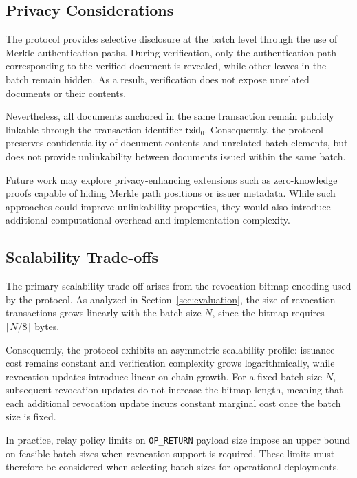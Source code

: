\documentclass{IEEEoj}
\begin{document}
\subsection{Privacy Considerations}

The protocol provides selective disclosure at the batch level through the use of Merkle authentication paths. 
During verification, only the authentication path corresponding to the verified document is revealed, while other leaves in the batch remain hidden. 
As a result, verification does not expose unrelated documents or their contents.

Nevertheless, all documents anchored in the same transaction remain publicly linkable through the transaction identifier $\mathsf{txid}_0$. 
Consequently, the protocol preserves confidentiality of document contents and unrelated batch elements, but does not provide unlinkability between documents issued within the same batch.

Future work may explore privacy-enhancing extensions such as zero-knowledge proofs capable of hiding Merkle path positions or issuer metadata. 
While such approaches could improve unlinkability properties, they would also introduce additional computational overhead and implementation complexity.

\subsection{Scalability Trade-offs}

The primary scalability trade-off arises from the revocation bitmap encoding used by the protocol. 
As analyzed in Section~\ref{sec:evaluation}, the size of revocation transactions grows linearly with the batch size $N$, since the bitmap requires $\lceil N/8 \rceil$ bytes.

Consequently, the protocol exhibits an asymmetric scalability profile: issuance cost remains constant and verification complexity grows logarithmically, while revocation updates introduce linear on-chain growth. 
For a fixed batch size $N$, subsequent revocation updates do not increase the bitmap length, meaning that each additional revocation update incurs constant marginal cost once the batch size is fixed.

In practice, relay policy limits on \texttt{OP\_RETURN} payload size impose an upper bound on feasible batch sizes when revocation support is required. 
These limits must therefore be considered when selecting batch sizes for operational deployments.
\end{document}
